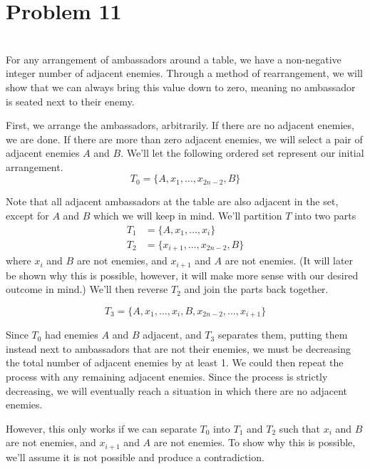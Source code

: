 \documentclass[12pt]{article}
\begin{document}
\newpage
\section*{Problem 11}
\\

For any arrangement of ambassadors around a table, we have a non-negative integer number of adjacent enemies. Through a method of rearrangement, we will show that we can always bring this value down to zero, meaning no ambassador is seated next to their enemy.

First, we arrange the ambassadors, arbitrarily. If there are no adjacent enemies, we are done. If there are more than zero adjacent enemies, we will select a pair of adjacent enemies $A$ and $B$. We'll let the following ordered set represent our initial arrangement.
\[T_0 = \{A,x_1,\dots,x_{2n-2},B\}\]

Note that all adjacent ambassadors at the table are also adjacent in the set, except for $A$ and $B$ which we will keep in mind. We'll partition $T$ into two parts
\begin{align*}
    T_1 &= \{A,x_1,\dots,x_i\} \\
    T_2 &= \{x_{i+1},\dots,x_{2n-2},B\}
\end{align*}
where $x_i$ and $B$ are not enemies, and $x_{i+1}$ and $A$ are not enemies. (It will later be shown why this is possible, however, it will make more sense with our desired outcome in mind.) We'll then reverse $T_2$ and join the parts back together.

\[T_3 = \{A,x_1,\dots,x_i,B,x_{2n-2},\dots,x_{i+1}\}\]

Since $T_0$ had enemies $A$ and $B$ adjacent, and $T_3$ separates them, putting them instead next to ambassadors that are not their enemies, we must be decreasing the total number of adjacent enemies by at least 1. We could then repeat the process with any remaining adjacent enemies. Since the process is strictly decreasing, we will eventually reach a situation in which there are no adjacent enemies.

However, this only works if we can separate $T_0$ into $T_1$ and $T_2$ such that $x_i$ and $B$ are not enemies, and $x_{i+1}$ and $A$ are not enemies. To show why this is possible, we'll assume it is not possible and produce a contradiction.
\end{document}
